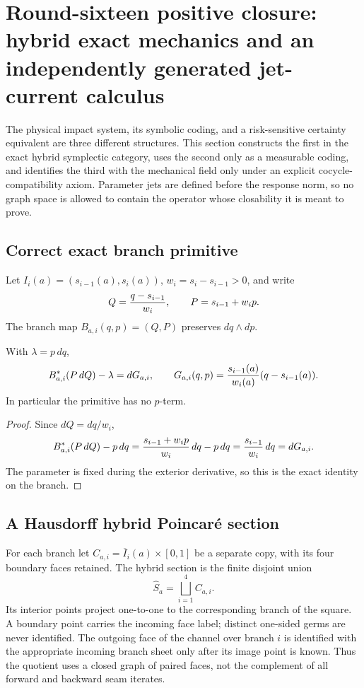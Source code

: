\section{Round-sixteen positive closure: hybrid exact mechanics and an independently generated jet-current calculus}
\label{sec:r16-a1}

The physical impact system, its symbolic coding, and a risk-sensitive
certainty equivalent are three different structures.  This section constructs
the first in the exact hybrid symplectic category, uses the second only as a
measurable coding, and identifies the third with the mechanical field only
under an explicit cocycle-compatibility axiom.  Parameter jets are defined
before the response norm, so no graph space is allowed to contain the operator
whose closability it is meant to prove.

\subsection{Correct exact branch primitive}

Let \(I_i(a)=(s_{i-1}(a),s_i(a))\), \(w_i=s_i-s_{i-1}>0\), and write
\[
 Q={q-s_{i-1}\over w_i},\qquad P=s_{i-1}+w_i p .
\]
The branch map \(B_{a,i}(q,p)=(Q,P)\) preserves \(dq\wedge dp\).

\begin{lemma}
\label{lem:r16-a1-primitive}
With \(\lambda=p\,dq\),
\[
 B_{a,i}^{*}(P\,dQ)-\lambda=dG_{a,i},
 \qquad
 G_{a,i}(q,p)={s_{i-1}(a)\over w_i(a)}
                 (q-s_{i-1}(a)).
\]
In particular the primitive has no \(p\)-term.
\end{lemma}

\begin{proof}
Since \(dQ=dq/w_i\),
\[
 B_{a,i}^{*}(P\,dQ)-p\,dq
 ={s_{i-1}+w_ip\over w_i}\,dq-p\,dq
 ={s_{i-1}\over w_i}\,dq=dG_{a,i}.
\]
The parameter is fixed during the exterior derivative, so this is the exact
identity on the branch.
\end{proof}

\subsection{A Hausdorff hybrid Poincar\'e section}

For each branch let \(C_{a,i}=\overline I_i(a)\times[0,1]\) be a separate
copy, with its four boundary faces retained.  The hybrid section is the finite
disjoint union
\[
 \widehat S_a=\bigsqcup_{i=1}^{4}C_{a,i}.
\]
Its interior points project one-to-one to the corresponding branch of the
square.  A boundary point carries the incoming face label; distinct one-sided
germs are never identified.  The outgoing face of the channel over branch
\(i\) is identified with the appropriate incoming branch sheet only after its
image point is known.  Thus the quotient uses a closed graph of paired faces,
not the complement of all forward and backward seam iterates.

